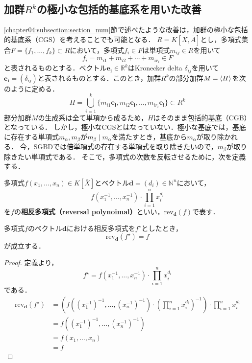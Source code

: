 \subsection{加群$R^k$の極小な包括的\groebner{}基底系を用いた改善}
\ref{chapter04:subsection:section_num}節で述べたような改善は，加群の極小な包括的\groebner{}基底系（CGS）を考えることでも可能となる．
$R = K[\bar{X}, \bar{A}]$とし，多項式集合$F = \{f_1, \dots, f_k\} \subset R$において，多項式$f_i \in F$は単項式$m_{ij} \in R$を用いて
$$f_i = m_{i1} + m_{i2} + \cdots + m_{ir_i} \in F$$
と表されるものとする．ベクトル$\bm{e_i} \in \mathbb{R}^k$はKronecker delta $\delta_{ij}$を用いて$\bm{e_i} = (\delta_{ij})$と表されるものとする．このとき，加群$R^k$の部分加群$M = \langle H \rangle$を次のように定める．
$$H = \bigcup_{i=1}^k \{m_{i1}\bm{e_i}, m_{i2}\bm{e_i}, \dots, m_{ir_i}\bm{e_i}\} \subset R^k$$
部分加群$M$の生成系は全て単項から成るため，$H$はそのまま包括的\groebner{}基底（CGB）となっている．
しかし，極小なCGSとはなっていない．極小な\groebner{}基底では，基底に存在する単項式$m_\alpha, m_\beta$が$m_\beta \mid m_\alpha$を満たすとき，基底から$m_\alpha$が取り除かれる．
今，SGBDでは倍単項式の存在する単項式を取り除きたいので，$m_\beta$が取り除きたい単項式である．
そこで，多項式の次数を反転させるために，次を定義する．
\begin{definition}
	多項式$f(x_1, \dots, x_n) \in K[\bar{X}]$とベクトル$\bm{d} = (d_i) \in \mathbb{N}^n$において，
	$$f(x_1^{-1}, \dots, x_n^{-1})\cdot \prod_{i=1}^n x_i^{d_i}$$
	を$f$の\textbf{相反多項式（reversal polynoimal）}といい，$\mathrm{rev}_{\bm{d}}(f)$で表す．
\end{definition}
\begin{theorem}
	\label{chapter04:theorem_reversal_poly}
	多項式$f$のベクトル$\bm{d}$における相反多項式を$f^\star$としたとき，
	$$\mathrm{rev}_{\bm{d}}(f^\star) = f$$
	が成立する．
\end{theorem}
\begin{proof}
	定義より，
	$$f^\star = f(x_1^{-1}, \dots, x_n^{-1})\cdot \prod_{i=1}^n x_i^{d_i}$$
	である．
	\begin{align*}
		\mathrm{rev}_{\bm{d}}(f^\star) &= \left( f\left( (x_1^{-1})^{-1}, \dots, (x_n^{-1})^{-1} \right)\cdot \left( \prod_{i=1}^n x_i^{d_i}\right)^{-1} \right) \cdot \prod_{i=1}^n x_i^{d_i} \\
		&= f((x_1^{-1})^{-1}, \dots, (x_n^{-1})^{-1}) \\
		&= f(x_1, \dots, x_n) \\
		&= f
	\end{align*}
\end{proof}
